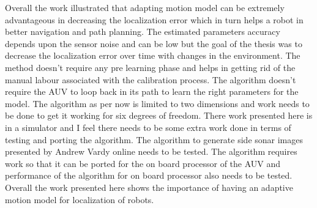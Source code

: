 \documentclass[12pt]{dalcsthesis}
\begin{document}
Overall the work illustrated that adapting motion model can be extremely advantageous in decreasing the localization error which in turn helps a robot in better navigation and path planning. The estimated parameters accuracy depends upon the sensor noise and can be low but the goal of the thesis was to decrease the localization error over  time with changes in the environment. The method doesn't require any pre learning phase and helps in getting rid of the manual labour associated with the calibration process. The algorithm doesn't require the AUV to loop back in its path to learn the right parameters for the model. The algorithm as per now is limited to two dimensions and work needs to be done to get it working for six degrees of freedom. There work presented here is in a simulator and I feel there needs to be some extra work done in terms of testing and porting the algorithm. The algorithm to generate side sonar images presented by Andrew Vardy online needs to be tested. The algorithm requires work so that it can be ported for the on board processor of the AUV and performance of the algorithm for on board processor also needs to be tested. Overall the work presented here shows the importance of having an adaptive motion model for localization of robots.   




\end{document}
